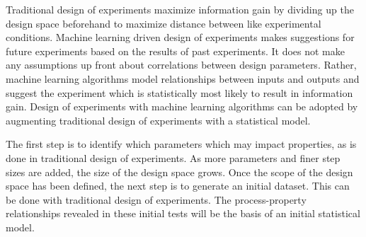 Traditional design of experiments maximize information gain by dividing up the design space beforehand to maximize distance between like experimental conditions. Machine learning driven design of experiments makes suggestions for future experiments based on the results of past experiments. It does not make any assumptions up front about correlations between design parameters. Rather, machine learning algorithms model relationships between inputs and outputs and suggest the experiment which is statistically most likely to result in information gain. Design of experiments with machine learning algorithms can be adopted by augmenting traditional design of experiments with a statistical model.

The first step is to identify which parameters which may impact properties, as is done in traditional design of experiments. As more parameters and finer step sizes are added, the size of the design space grows. Once the scope of the design space has been defined, the next step is to generate an initial dataset. This can be done with traditional design of experiments. The process-property relationships revealed in these initial tests will be the basis of an initial statistical model. 

